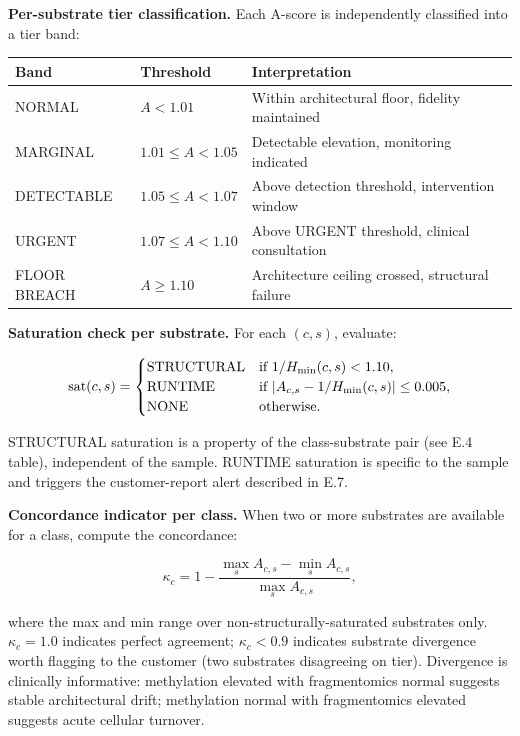 \documentclass[12pt,a4paper]{article}
\begin{document}
\textbf{Per-substrate tier classification.} Each A-score is
independently classified into a tier band:

\begin{center}
\footnotesize
\begin{tabular}{lll}
\toprule
Band & Threshold & Interpretation \\
\midrule
NORMAL       & $A < 1.01$          & Within architectural floor, fidelity maintained \\
MARGINAL     & $1.01 \leq A < 1.05$ & Detectable elevation, monitoring indicated \\
DETECTABLE   & $1.05 \leq A < 1.07$ & Above detection threshold, intervention window \\
URGENT       & $1.07 \leq A < 1.10$ & Above URGENT threshold, clinical consultation \\
FLOOR BREACH & $A \geq 1.10$        & Architecture ceiling crossed, structural failure \\
\bottomrule
\end{tabular}
\end{center}

\textbf{Saturation check per substrate.} For each $(c, s)$, evaluate:

\begin{equation}
\mathrm{sat}(c, s) = \begin{cases}
\mathrm{STRUCTURAL} & \text{if } 1/H_{\rm min}(c,s) < 1.10, \\
\mathrm{RUNTIME} & \text{if } |A_{c,s} - 1/H_{\rm min}(c,s)| \leq 0.005, \\
\mathrm{NONE} & \text{otherwise}.
\end{cases}
\label{eq:sat_check}
\end{equation}

STRUCTURAL saturation is a property of the class-substrate pair (see
E.4 table), independent of the sample. RUNTIME saturation is specific
to the sample and triggers the customer-report alert described in
E.7.

\textbf{Concordance indicator per class.} When two or more substrates
are available for a class, compute the concordance:

\begin{equation}
\kappa_c = 1 - \frac{\max_s A_{c,s} - \min_s A_{c,s}}{\max_s A_{c,s}},
\label{eq:concordance}
\end{equation}

where the max and min range over non-structurally-saturated
substrates only. $\kappa_c = 1.0$ indicates perfect agreement;
$\kappa_c < 0.9$ indicates substrate divergence worth flagging to
the customer (two substrates disagreeing on tier). Divergence is
clinically informative: methylation elevated with fragmentomics
normal suggests stable architectural drift; methylation normal with
fragmentomics elevated suggests acute cellular turnover.
\end{document}
